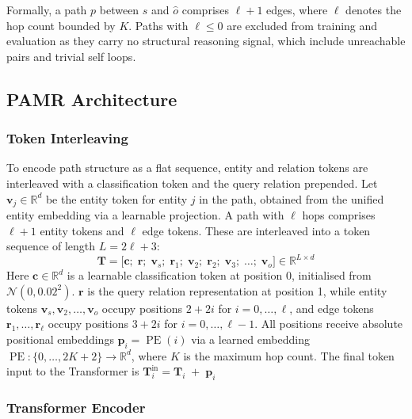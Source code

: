 \documentclass[runningheads]{llncs}
\begin{document}
Formally, a path $p$ between $s$ and $\hat{o}$ comprises $\ell + 1$ edges, where
$\ell$ denotes the hop count bounded by $K$.
Paths with $\ell \leq 0$ are excluded from training and evaluation as they
carry no structural reasoning signal, which include unreachable pairs and
trivial self loops.

\subsection{PAMR Architecture}
\label{sec:pamr-architecture}

\subsubsection{Token Interleaving}
\label{sec:token-interleaving}

To encode path structure as a flat sequence, entity and relation tokens are interleaved
with a classification token and the query relation prepended.
Let $\mathbf{v}_j \in \mathbb{R}^{d}$ be the entity token for entity $j$ in the path,
obtained from the unified entity embedding via a learnable projection.
A path with $\ell$ hops comprises $\ell+1$ entity tokens and $\ell$ edge tokens.
These are interleaved into a token sequence of length $L = 2\ell + 3$:
\begin{equation}
  \mathbf{T} = \bigl[\mathbf{c};\; \mathbf{r};\;
    \mathbf{v}_{s};\; \mathbf{r}_{1};\; \mathbf{v}_{2};\; \mathbf{r}_{2};\;
  \mathbf{v}_{3};\; \ldots;\; \mathbf{v}_{o}\bigr]
  \in \mathbb{R}^{L \times d}
  \label{eq:token-seq}
\end{equation}
Here $\mathbf{c} \in \mathbb{R}^{d}$ is a learnable classification token
at position 0, initialised from $\mathcal{N}(0, 0.02^2)$.
$\mathbf{r}$ is the query relation representation at position 1, while entity tokens
$\mathbf{v}_{s}, \mathbf{v}_{2}, \ldots, \mathbf{v}_{o}$ occupy positions $2 + 2i$
for $i = 0, \ldots, \ell$, and edge tokens $\mathbf{r}_{1}, \ldots, \mathbf{r}_{\ell}$
occupy positions $3 + 2i$ for $i = 0, \ldots, \ell - 1$.
All positions receive absolute positional embeddings
$\mathbf{p}_i = \operatorname{PE}(i)$ via a learned embedding
$\operatorname{PE}: \{0, \ldots, 2K+2\} \to \mathbb{R}^{d}$,
where $K$ is the maximum hop count.
The final token input to the Transformer is $\mathbf{T}^{\text{in}}_i = \mathbf{T}_i \;+\; \mathbf{p}_i$
\subsubsection{Transformer Encoder}
\end{document}
